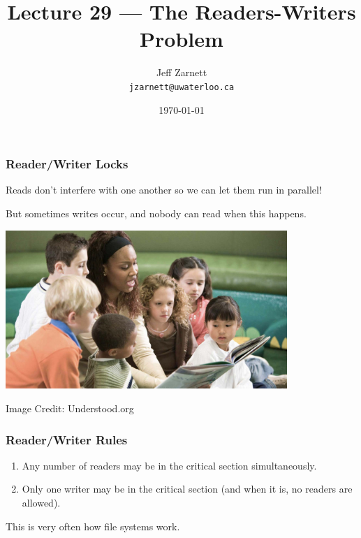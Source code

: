 
\usepackage{multirow}

\title{Lecture 29 --- The Readers-Writers Problem }

\author{Jeff Zarnett \\ \small \texttt{jzarnett@uwaterloo.ca}}
\date{\today}




\begin{frame}
	\titlepage

\end{frame}

\begin{frame}
	\frametitle{Reader/Writer Locks}
	Reads don't interfere with one another so we can let them run in parallel!

	But sometimes writes occur, and nobody can read when this happens.

	\begin{center}
		\includegraphics[width=0.8\textwidth]{images/groupreading.jpg}
	\end{center}
	\hfill Image Credit: Understood.org
\end{frame}

\begin{frame}
	\frametitle{Reader/Writer Rules}


	\begin{enumerate}
		\item Any number of readers may be in the critical section simultaneously.
		\item Only one writer may be in the critical section (and when it is, no readers are allowed).
	\end{enumerate}


	This is very often how file systems work.

\end{frame}


